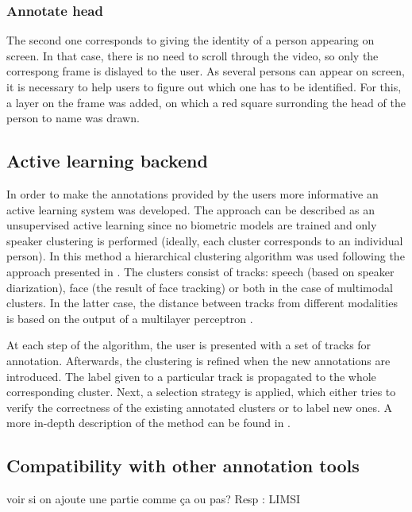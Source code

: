 \documentclass[a4paper]{article}
\begin{document}
\subsubsection{Annotate head} \label{sec:head}
The second one corresponds to giving the identity of a person appearing on screen. In that case, there is no need to scroll through the video, so only the correspong frame is dislayed to the user. As several persons can appear on screen, it is necessary to help users to figure out which one has to be identified. For this, a layer on the frame was added, on which a red square surronding the head of the person to name was drawn.\\



      \subsection{Active learning backend}

In order to make the annotations provided by the users more informative an active learning system 
was developed. The approach can be described as an unsupervised active learning since no biometric models are trained and only speaker clustering is performed (ideally, each cluster corresponds to an individual person).  In this method a hierarchical clustering algorithm was used 
following the  approach presented in \cite{poignant2012unsupervised}.  The clusters consist of tracks: speech (based on speaker diarization),  face (the result of face tracking) or both in the case of multimodal clusters. In the latter case, the distance between tracks from different modalities is based on the output of a multilayer perceptron \cite{bredin2012fusion}.

At each step of the algorithm, the user is presented with a set of tracks for annotation. Afterwards, the clustering is refined when the new annotations are introduced.
The label given to a particular track is propagated to the whole corresponding cluster. Next, a selection strategy is applied, which either tries to verify the correctness of the existing annotated clusters or to label new ones.
A more in-depth description of the method can be found in \cite{budnik2014automatic}.

      \subsection{Compatibility with other annotation tools}
voir si on ajoute une partie comme ça ou pas?
Resp : LIMSI
\end{document}
